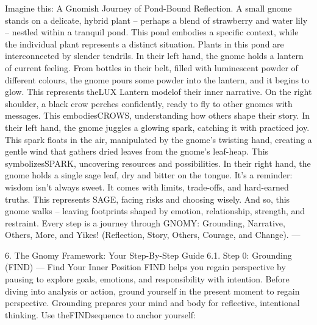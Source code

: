 Imagine this: A Gnomish Journey of Pond-Bound Reflection. A small gnome stands on a delicate, hybrid
plant – perhaps a blend of strawberry and water lily – nestled within a tranquil pond. This pond embodies
a specific context, while the individual plant represents a distinct situation. Plants in this pond are
interconnected by slender tendrils.
In their left hand, the gnome holds a lantern of current feeling. From bottles in their belt, filled with
luminescent powder of different colours, the gnome pours some powder into the lantern, and it begins to
glow. This represents theLUX Lantern modelof their inner narrative.
On the right shoulder, a black crow perches confidently, ready to fly to other gnomes with messages.
This embodiesCROWS, understanding how others shape their story.
In their left hand, the gnome juggles a glowing spark, catching it with practiced joy. This spark floats
in the air, manipulated by the gnome’s twisting hand, creating a gentle wind that gathers dried leaves
from the gnome’s leaf-heap. This symbolizesSPARK, uncovering resources and possibilities.
In their right hand, the gnome holds a single sage leaf, dry and bitter on the tongue. It’s a reminder:
wisdom isn’t always sweet. It comes with limits, trade-offs, and hard-earned truths. This represents
SAGE, facing risks and choosing wisely.
And so, this gnome walks – leaving footprints shaped by emotion, relationship, strength, and restraint.
Every step is a journey through GNOMY: Grounding, Narrative, Others, More, and Yikes! (Reflection,
Story, Others, Courage, and Change).
—

6.
The Gnomy Framework: Your Step-By-Step
Guide
6.1. Step 0: Grounding (FIND) — Find Your Inner Position
FIND helps you regain perspective by pausing to explore goals, emotions, and responsibility with intention.
Before diving into analysis or action, ground yourself in the present moment to regain perspective.
Grounding prepares your mind and body for reflective, intentional thinking. Use theFINDsequence to
anchor yourself:

